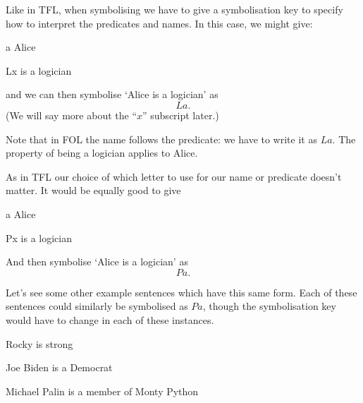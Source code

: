 
Like in TFL, when symbolising we have to give a symbolisation key to specify how to interpret the predicates and names. In this case, we might give:
\begin{ekey}
\item[a] Alice
\item[Lx]  is a logician
\end{ekey}
and we can then symbolise `Alice is a logician' as $$La.$$ (We will say more about the ``$x$'' subscript later.)

Note that in FOL the name follows the predicate: we have to write it as $La$. The property of being a logician applies to Alice.

As in TFL our choice of which letter to use for our name or predicate doesn't matter. It would be equally good to give
\begin{ekey}
\item[a] Alice
\item[Px]  is a logician
\end{ekey}And then symbolise `Alice is a logician' as $$Pa.$$

Let's see some other example sentences which have this same form. Each of these sentences could similarly be symbolised as $Pa$, though the symbolisation key would have to change in each of these instances.
\begin{earg}
\item[\ex{folrocky}] Rocky is strong
\item[\ex{folbiden}] Joe Biden is a Democrat
\item[\ex{folpalin}] Michael Palin is a member of Monty Python
\end{earg}

